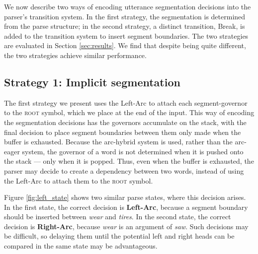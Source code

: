 \documentclass[11pt,letterpaper]{article}
\begin{document}
We now describe two ways of encoding utterance segmentation decisions into the
parser's transition system.  In the first strategy, the segmentation is determined
from the parse structure; in the second strategy, a distinct transition, Break,
is added to the transition system to insert segment boundaries.
The two strategies are evaluated in Section \ref{sec:results}.
We find that despite being quite different, the two strategies achieve similar
performance.

\subsection{Strategy 1: Implicit segmentation}

The first strategy we present uses the Left-Arc to attach each segment-governor
to the \textsc{root} symbol, which we place at the end of the input.
This way of encoding the segmentation decisions has the governors accumulate on
the stack, with the final decision to place segment boundaries between them only
made when the buffer is exhausted.  Because the arc-hybrid system is used, rather
than the arc-eager system, the governor of a word is not determined when it is pushed
onto the stack --- only when it is popped.  Thus, even when the buffer is exhausted,
the parser may decide to create a dependency between two words, instead of
using the Left-Arc to attach them to the \textsc{root} symbol.

Figure \ref{fig:left_state} shows two similar parse states, where this decision
arises.  In the first state, the correct decision is \textbf{Left-Arc}, because
a segment boundary should be inserted between \emph{wear} and \emph{tires}.
In the second state, the correct decision is \textbf{Right-Arc}, because
\emph{wear} is an argument of \emph{saw}.  Such decisions may be difficult,
so delaying them until the potential left and right heads can be compared in the
same state may be advantageous.
\end{document}
